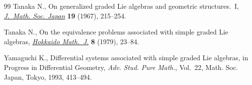 \documentclass[pdftex]{sigma}
\begin{document}
\begin{thebibliography}{99}
Tanaka N., On generalized graded {L}ie algebras and geometric structures.~{I},
  \href{http://dx.doi.org/10.2969/jmsj/01920215}{\textit{J.~Math. Soc. Japan}} \textbf{19} (1967), 215--254.

Tanaka N., On the equivalence problems associated with simple graded {L}ie
  algebras, \href{http://dx.doi.org/10.14492/hokmj/1381758416}{\textit{Hokkaido Math.~J.}} \textbf{8} (1979), 23--84.

Yamaguchi K., Dif\/ferential systems associated with simple graded {L}ie
  algebras, in Progress in Dif\/ferential Geometry, \textit{Adv. Stud. Pure
  Math.}, Vol.~22, Math. Soc. Japan, Tokyo, 1993, 413--494.

\end{thebibliography}\LastPageEnding
\end{document}
